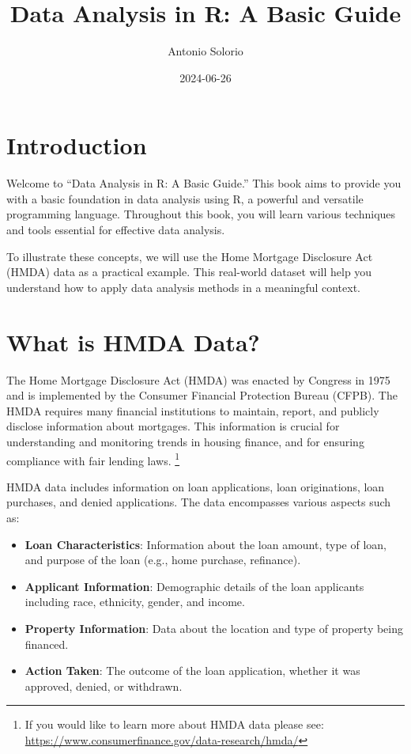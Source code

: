 \documentclass[
]{book}
\title{Data Analysis in R: A Basic Guide}
\author{Antonio Solorio}
\date{2024-06-26}
\providecommand{\tightlist}{%
  \setlength{\itemsep}{0pt}\setlength{\parskip}{0pt}}
\begin{document}
\maketitle

{
\setcounter{tocdepth}{1}
\tableofcontents
}
\chapter*{Introduction}\label{introduction}

Welcome to ``Data Analysis in R: A Basic Guide.'' This book aims to provide you with a basic foundation in data analysis using R, a powerful and versatile programming language. Throughout this book, you will learn various techniques and tools essential for effective data analysis.

To illustrate these concepts, we will use the Home Mortgage Disclosure Act (HMDA) data as a practical example. This real-world dataset will help you understand how to apply data analysis methods in a meaningful context.

\chapter{What is HMDA Data?}\label{what-is-hmda-data}

The Home Mortgage Disclosure Act (HMDA) was enacted by Congress in 1975 and is implemented by the Consumer Financial Protection Bureau (CFPB). The HMDA requires many financial institutions to maintain, report, and publicly disclose information about mortgages. This information is crucial for understanding and monitoring trends in housing finance, and for ensuring compliance with fair lending laws. \footnote{If you would like to learn more about HMDA data please see: \url{https://www.consumerfinance.gov/data-research/hmda/}}

HMDA data includes information on loan applications, loan originations, loan purchases, and denied applications. The data encompasses various aspects such as:

\begin{itemize}
\tightlist
\item
  \textbf{Loan Characteristics}: Information about the loan amount, type of loan, and purpose of the loan (e.g., home purchase, refinance).
\item
  \textbf{Applicant Information}: Demographic details of the loan applicants including race, ethnicity, gender, and income.
\item
  \textbf{Property Information}: Data about the location and type of property being financed.
\item
  \textbf{Action Taken}: The outcome of the loan application, whether it was approved, denied, or withdrawn.
\end{itemize}
\end{document}
